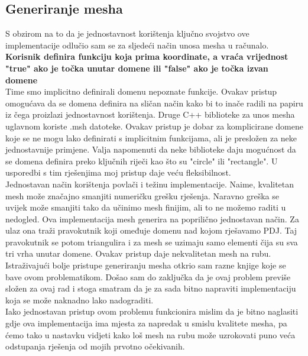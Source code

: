 \documentclass[zavrsnirad]{../fer}
\begin{document}
\subsection{Generiranje mesha}

S obzirom na to da
je jednostavnost korištenja ključno svojstvo ove implementacije 
odlučio sam se za sljedeći način unosa mesha u računalo.
\bigskip
\\ 
\textbf{Korisnik definira funkciju koja prima koordinate, a
vraća vrijednost "true" ako je točka unutar domene ili
"false" ako je točka izvan domene}
\bigskip
\\ 
Time smo implicitno definirali domenu nepoznate funkcije.
Ovakav pristup omogućava da se domena definira na sličan 
način kako bi to inače radili na papiru iz čega
proizlazi jednostavnost korištenja.
Druge C++ biblioteke za unos mesha uglavnom koriste .msh datoteke.
Ovakav pristup je dobar za komplicirane domene koje se ne mogu
lako definirati s implicitnim funkcijama, ali je presložen za neke
jednostavnije primjene. Valja napomenuti da neke biblioteke 
daju mogućnost da se domena definira preko ključnih riječi kao 
što su "circle" ili "rectangle". U usporedbi s tim rješenjima 
moj pristup daje veću fleksibilnost.
\bigskip
\\ 
Jednostavan način korištenja povlači i težinu implementacije.
Naime, kvalitetan mesh može značajno smanjiti numeričku grešku
rješenja. Naravno greška se uvijek može smanjiti tako da 
učinimo mesh finijim, ali to ne možemo raditi u nedogled.
Ova implementacija mesh generira na poprilično jednostavan način.
Za ulaz ona traži pravokutnik koji omeđuje domenu nad kojom
rješavamo PDJ. Taj pravokutnik se potom triangulira i za mesh
se uzimaju samo elementi čija su sva tri vrha unutar domene.
Ovakav pristup daje nekvalitetan mesh na rubu. Istraživajući
bolje pristupe generiranju mesha otkrio sam razne knjige koje
se bave ovom problematikom. Došao sam do zaključka da 
je ovaj problem previše složen za ovaj rad i stoga smatram da
je za sada bitno napraviti implementaciju koja se može naknadno lako 
nadograditi.
\\
Iako jednostavan pristup ovom problemu funkcionira
mislim da je bitno naglasiti gdje ova implementacija ima
mjesta za napredak u smislu kvalitete mesha, pa ćemo tako 
u nastavku vidjeti kako loš mesh na rubu može uzrokovati 
puno veća odstupanja rješenja od mojih prvotno očekivanih.
\end{document}
